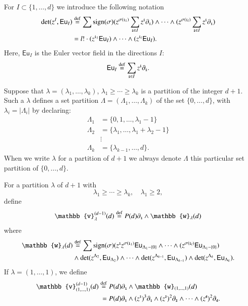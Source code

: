 \documentclass[main.tex]{subfiles}
\begin{document}
For $I \subset \{1,\ldots,d\}$ we introduce the following notation
\begin{align}
  \mathrm{det}(z^{I},\mathsf{Eu}_{I})
& \overset{\rm def}{=} \sum\mathrm{sign}(\sigma)({z}^{\sigma(\textbf{\texttt{\tiny{i}}}_1)}\sum_{\textbf{\texttt{\tiny{i}}}\in I}z^{\textbf{\texttt{\tiny{i}}}}\partial_{\textbf{\texttt{\tiny{i}}}})\wedge\cdots\wedge ({z}
^{\sigma(\textbf{\texttt{\tiny{i}}}_l)}\sum_{\textbf{\texttt{\tiny{i}}}\in I}z^{\textbf{\texttt{\tiny{i}}}}\partial_{\textbf{\texttt{\tiny{i}}}}) \\
& =l!\cdot({z}^{\textbf{\texttt{\tiny{i}}}_1}\mathsf{Eu}_I)\wedge\cdots\wedge ({z}^{\textbf{\texttt{\tiny{i}}}_l}\mathsf{Eu}_I).
\end{align} 
Here, $\mathsf{Eu}_I$ is the Euler vector field in the directions $I$:
\begin{equation}\label{}
  \mathsf{Eu}_I \overset{\rm def}{=} \sum_{\textbf{\texttt{\tiny{i}}} \in I} z^{\textbf{\texttt{\tiny{i}}}} \partial_{\textbf{\texttt{\tiny{i}}}} .
\end{equation}

Suppose that $\lambda = (\lambda_1,\ldots, \lambda_k)$, $\lambda_1 \geq \cdots \geq \lambda_k$ is a partition of the
integer $d+1$.
Such a $\lambda$ defines a set partition $\Lambda = (\Lambda_1,\ldots, \Lambda_k)$ of the set $\{0,\ldots,d\}$, with
$\lambda_i = |\Lambda_i|$ by
declaring: 
\begin{align*}
  \Lambda_1 & = \{0,1,\ldots, \lambda_1-1\} \\
  \Lambda_2 & = \{\lambda_1,\ldots, \lambda_1+\lambda_2-1\} \\
  & \vdots \\
  \Lambda_k & = \{\lambda_{k-1}, \ldots, d\} .
\end{align*}
When we write $\lambda$ for a partition of $d+1$ we always denote $\Lambda$ this particular set partition of
$\{0,\ldots,d\}$.
\begin{definition}\label{dfn:partitionv}
  For a partition $\lambda$ of $d+1$ with 
    \[
    \lambda_1 \geq \cdots \geq \lambda_k,\quad \lambda_1 \geq 2,
    \]
    define
    \[
      \mathbb{v}^{(d-1)}_{\lambda}(d) \define P(d) \partial_{\1}\wedge \mathbb{w}_\lambda(d) 
    \]
    where
    \begin{align*}
      \mathbb{w}_\lambda(d) &\define \sum\mathrm{sign}(\sigma)(z^{\1}{z}^{\sigma(\ii_1)}\mathsf{Eu}_{\Lambda_1-\{0\}}\wedge\cdots\wedge ({z}^{\sigma(\ii_l)}\mathsf{Eu}_{\Lambda_1-\{0\}})
                         \\ & \wedge \mathrm{det}(z^{\Lambda_2},\mathsf{Eu}_{\Lambda_2})\wedge\cdots \wedge\mathrm{det}(z^{\Lambda_{k-1}},\mathsf{Eu}_{\Lambda_{k-1}})\wedge\mathrm{det}(z^{\Lambda_{k}},\mathsf{Eu}_{\Lambda_{k}}).
    \end{align*}
    If $\lambda=(1,\dots,1)$, we define
  \begin{align*}
    \mathbb{v}^{(d-1)}_{(1,\dots,1)}(d) & \define P(d)\partial_{\1}\wedge \mathbb{w}_{(1,\dots,1)} (d) \\ & \; = P(d)
    \del_{\1} \wedge (z^{\1})^{3}\partial_{\1}\wedge (z^{\2})^{2}\partial_{\2}\wedge\cdots\wedge (z^{\dd})^{2}
    \partial_{\dd} .
  \end{align*}
\end{definition}
\end{document}
